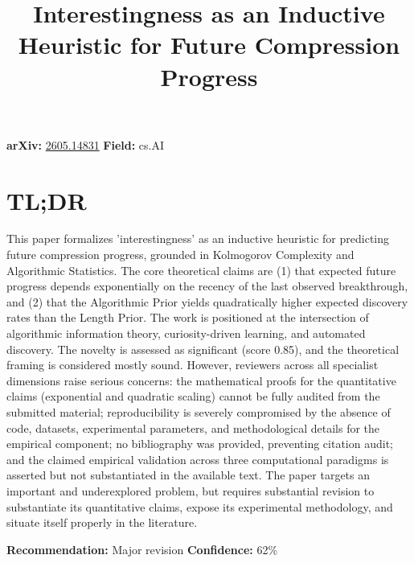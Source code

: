 \documentclass[11pt]{article}
\title{Interestingness as an Inductive Heuristic for Future Compression Progress}
\date{}
\begin{document}
\maketitle

\noindent\textbf{arXiv:} \href{https://arxiv.org/abs/2605.14831}{2605.14831} \quad \textbf{Field:} cs.AI\\

\section*{TL;DR}
This paper formalizes 'interestingness' as an inductive heuristic for predicting future compression progress, grounded in Kolmogorov Complexity and Algorithmic Statistics. The core theoretical claims are (1) that expected future progress depends exponentially on the recency of the last observed breakthrough, and (2) that the Algorithmic Prior yields quadratically higher expected discovery rates than the Length Prior. The work is positioned at the intersection of algorithmic information theory, curiosity-driven learning, and automated discovery. The novelty is assessed as significant (score 0.85), and the theoretical framing is considered mostly sound. However, reviewers across all specialist dimensions raise serious concerns: the mathematical proofs for the quantitative claims (exponential and quadratic scaling) cannot be fully audited from the submitted material; reproducibility is severely compromised by the absence of code, datasets, experimental parameters, and methodological details for the empirical component; no bibliography was provided, preventing citation audit; and the claimed empirical validation across three computational paradigms is asserted but not substantiated in the available text. The paper targets an important and underexplored problem, but requires substantial revision to substantiate its quantitative claims, expose its experimental methodology, and situate itself properly in the literature.

\textbf{Recommendation:} Major revision \quad \textbf{Confidence:} 62\%\\
\end{document}
